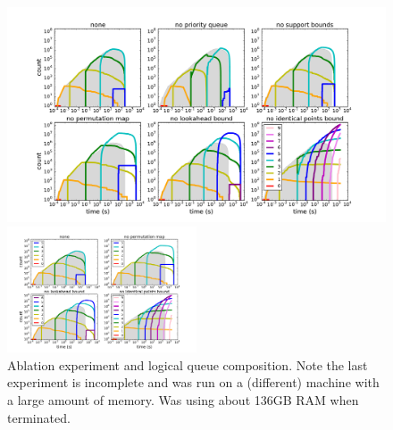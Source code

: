 \begin{figure}[t!]
\begin{center}
\begin{arxiv}
\includegraphics[width=\textwidth]{figs/ela_compas_compare-queue.pdf}
\end{arxiv}
\begin{kdd}
\includegraphics[trim={30mm 10mm 20mm 10mm}, width=0.5\textwidth]{figs/ela_compas_compare_small-queue.pdf}
\end{kdd}
\end{center}
\caption{Ablation experiment and logical queue composition.
Note the last experiment is incomplete and was run on a (different)
machine with a large amount of memory.  Was using about 136GB RAM when terminated.
}
\label{fig:queue}
\end{figure}



